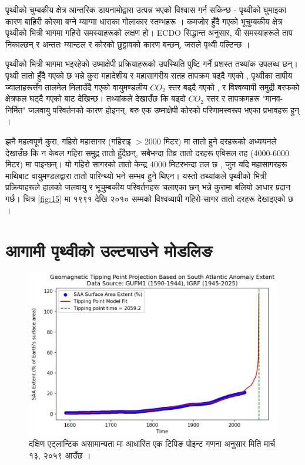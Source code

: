 \documentclass[10pt,twocolumn,letterpaper]{article}
\begin{document}
पृथ्वीको चुम्बकीय क्षेत्र आन्तरिक डायनामोद्वारा उत्पन्न भएको विश्वास गर्न सकिन्छ - पृथ्वीको घुमाइका कारण बाहिरी कोरमा बग्ने म्याग्मा धाराका गोलाकार स्तम्भहरू \cite{123}। कमजोर हुँदै गएको भूचुम्बकीय क्षेत्र पृथ्वीको भित्री भागमा गहिरो समस्याहरूको लक्षण हो। ECDO सिद्धान्त अनुसार, यी समस्याहरूले ताप निकाल्छन् र अन्ततः म्यान्टल र कोरको छुट्टावको कारण बन्छन्, जसले पृथ्वी पल्टिन्छ \cite{1}।

पृथ्वीको भित्री भागमा भइरहेको उष्माक्षेपी प्रक्रियाहरूको उपस्थिति पुष्टि गर्ने प्रशस्त तथ्यांक उपलब्ध छन्। पृथ्वी तातो हुँदै गएको छ भन्ने कुरा महादेशीय र महासागरीय सतह तापक्रम बढ्दै गएको \cite{127,128}, पृथ्वीका तापीय ज्वालाहरूसँग तालमेल मिलाउँदै गएको वायुमण्डलीय $CO_2$ स्तर बढ्दै गएको \cite{129,130}, र विश्वव्यापी समुद्री बरफको क्षेत्रफल घट्दै गएको \cite{131} बाट देखिन्छ। तथ्यांकले देखाउँछ कि बढ्दो $CO_2$ स्तर र तापक्रमहरू "मानव-निर्मित" जलवायु परिवर्तनको कारण होइनन्, बरु एक उष्माक्षेपी कोरको परिणामस्वरूप भएका प्रभावहरू हुन् \cite{129}।

झनै महत्वपूर्ण कुरा, गहिरो महासागर (गहिराइ $>$2000 मिटर) मा तातो हुने दरहरूको अध्ययनले देखाउँछ कि न केवल गहिरा समुद्र तातो हुँदैछन्, सबैभन्दा तिव्र तातो दरहरू एबिसल तह (4000-6000 मिटर) मा पाइन्छन्। यो गहिरो सागरको तातो केन्द्र 4000 मिटरभन्दा तल छ \cite{132,129}, जुन यदि महासागरहरू माथिबाट वायुमण्डलद्वारा तातो पारिन्थ्यो भने सम्भव हुने थिएन। यस्तो तथ्यांकले पृथ्वीको भित्री प्रक्रियाहरूले हालको जलवायु र भूचुम्बकीय परिवर्तनहरू चलाएका छन् भन्ने कुरामा बलियो आधार प्रदान गर्छ। चित्र \ref{fig:15} मा १९९१ देखि २०१० सम्मको विश्वव्यापी गहिरो-सागर तातो दरहरू देखाइएको छ \cite{132}।
\section{आगामी पृथ्वीको उल्ट्याउने मोडलिङ}

\begin{figure}[t]
\begin{center}
   \includegraphics[width=1\linewidth]{saa-crop.jpeg}
\end{center}
   \caption{दक्षिण एट्लान्टिक असामान्यता मा आधारित एक टिपिङ पोइन्ट गणना अनुसार मिति मार्च १३, २०५९ आउँछ \cite{125,126}।}
\label{fig:16}
\label{fig:onecol}
\end{figure}
\end{document}
